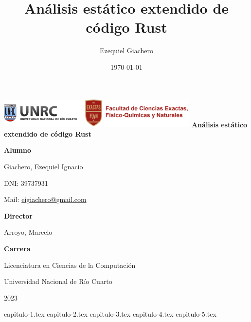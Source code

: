 \documentclass{report}
\title{Análisis estático extendido de código Rust}
\author{Ezequiel Giachero}
\date{\today}
\begin{document}
\begin{titlepage}
    {
        \includegraphics[height=1.5cm]{./images/Logo UNRC.png}
        \hfill
        \includegraphics[height=1.5cm]{./images/Logo Exactas.png} 
    }
    \vfill
    \centering
    {\bfseries \Huge Análisis estático extendido de código Rust}
    \vfill
    \vspace{1cm}
    {\bfseries \Large Alumno\par}   
    {
        Giachero, Ezequiel Ignacio\par
        DNI: 39737931\par
        Mail: \href{mailto:eigiachero@gmail.com}{eigiachero@gmail.com}\par
    }\vspace{1cm}
    {\bfseries \Large Director\par}    
    {
        Arroyo, Marcelo\par
    }\vspace{1cm}
    {\bfseries \Large Carrera\par}    
    {
        Licenciatura en Ciencias de la Computación\par
        Universidad Nacional de Río Cuarto\par
        2023\par
    }
    
\end{titlepage}
\tableofcontents

{capitulo-1.tex} %
{capitulo-2.tex} %
{capitulo-3.tex} %
{capitulo-4.tex} %
{capitulo-5.tex} %


\nocite{*}


\end{document}
